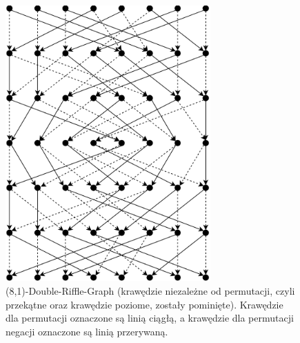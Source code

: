 \begin{figure}
		\centering
		\includegraphics[width=0.7\textwidth]{all_rs1.png}

		\caption{(8,1)-Double-Riffle-Graph (krawędzie niezależne od permutacji, czyli przekątne oraz krawędzie poziome, zostały pominięte). Krawędzie dla permutacji oznaczone są linią ciągłą, a krawędzie dla permutacji negacji oznaczone są linią przerywaną.}
		\label{2::im3}
\end{figure}

